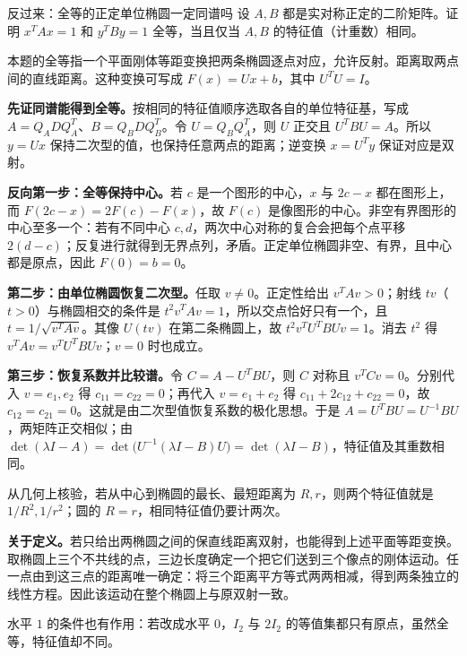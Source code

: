 \begin{example}{反过来：全等的正定单位椭圆一定同谱吗}
设 $A,B$ 都是实对称正定的二阶矩阵。证明 $x^TAx=1$ 和 $y^TBy=1$ 全等，当且仅当 $A,B$ 的特征值（计重数）相同。
\end{example}
\begin{solution}
本题的全等指一个平面刚体等距变换把两条椭圆逐点对应，允许反射。距离取两点间的直线距离。这种变换可写成 $F(x)=Ux+b$，其中 $U^TU=I$。

\textbf{先证同谱能得到全等。}按相同的特征值顺序选取各自的单位特征基，写成 $A=Q_ADQ_A^T$、$B=Q_BDQ_B^T$。令 $U=Q_BQ_A^T$，则 $U$ 正交且 $U^TBU=A$。所以 $y=Ux$ 保持二次型的值，也保持任意两点的距离；逆变换 $x=U^Ty$ 保证对应是双射。

\textbf{反向第一步：全等保持中心。}若 $c$ 是一个图形的中心，$x$ 与 $2c-x$ 都在图形上，而
$F(2c-x)=2F(c)-F(x)$，故 $F(c)$ 是像图形的中心。非空有界图形的中心至多一个：若有不同中心 $c,d$，两次中心对称的复合会把每个点平移 $2(d-c)$；反复进行就得到无界点列，矛盾。正定单位椭圆非空、有界，且中心都是原点，因此 $F(0)=b=0$。

\textbf{第二步：由单位椭圆恢复二次型。}任取 $v\ne0$。正定性给出 $v^TAv>0$；射线 $tv$（$t>0$）与椭圆相交的条件是 $t^2v^TAv=1$，所以交点恰好只有一个，且 $t=1/\sqrt{v^TAv}$。其像 $U(tv)$ 在第二条椭圆上，故 $t^2v^TU^TBUv=1$。消去 $t^2$ 得 $v^TAv=v^TU^TBUv$；$v=0$ 时也成立。

\textbf{第三步：恢复系数并比较谱。}令 $C=A-U^TBU$，则 $C$ 对称且 $v^TCv=0$。分别代入 $v=e_1,e_2$ 得 $c_{11}=c_{22}=0$；再代入 $v=e_1+e_2$ 得 $c_{11}+2c_{12}+c_{22}=0$，故 $c_{12}=c_{21}=0$。这就是由二次型值恢复系数的极化思想。于是 $A=U^TBU=U^{-1}BU$，两矩阵正交相似；由
$\det(\lambda I-A)=\det\bigl(U^{-1}(\lambda I-B)U\bigr)=\det(\lambda I-B)$，特征值及其重数相同。

从几何上核验，若从中心到椭圆的最长、最短距离为 $R,r$，则两个特征值就是 $1/R^2,1/r^2$；圆的 $R=r$，相同特征值仍要计两次。

\textbf{关于定义。}若只给出两椭圆之间的保直线距离双射，也能得到上述平面等距变换。取椭圆上三个不共线的点，三边长度确定一个把它们送到三个像点的刚体运动。任一点由到这三点的距离唯一确定：将三个距离平方等式两两相减，得到两条独立的线性方程。因此该运动在整个椭圆上与原双射一致。

水平 $1$ 的条件也有作用：若改成水平 $0$，$I_2$ 与 $2I_2$ 的等值集都只有原点，虽然全等，特征值却不同。
\end{solution}

